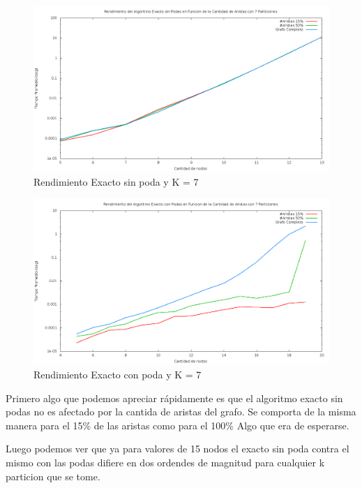 \begin{figure}[H]
\begin{center}
\includegraphics[scale=0.3]{finales/rendimientoExactoSinPoda7Particiones.png}
\caption{Rendimiento Exacto sin poda y K = 7}
\end{center}
\end{figure}

\begin{figure}[H]
\begin{center}
\includegraphics[scale=0.3]{finales/rendimientoExactoConPoda7Particiones.png}
\caption{Rendimiento Exacto con poda y K = 7}
\end{center}
\end{figure}


Primero algo que podemos apreciar r\'apidamente es que el algoritmo exacto sin podas no es afectado por la cantida de aristas del grafo. Se comporta de la misma manera para el 15\% de las aristas como para el 100\% Algo que era de esperarse.

Luego podemos ver que ya para valores de 15 nodos el exacto sin poda contra el mismo con las podas difiere en dos ordendes de magnitud para cualquier k particion que se tome.

